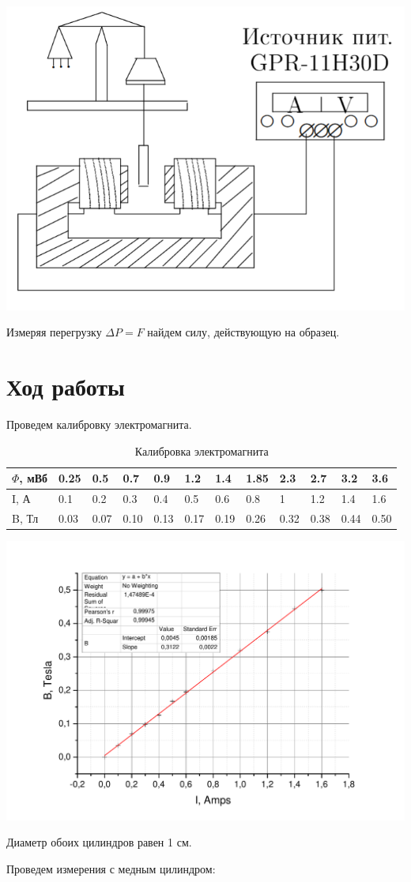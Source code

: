 \documentclass[a4paper,12pt]{article}
\begin{document}
	\includegraphics[width = 0.5\linewidth]{pic1}
	
	Измеряя перегрузку $\Delta P = F$ найдем силу, действующую на образец.
	\section{Ход работы}
	Проведем калибровку электромагнита.
		
		\begin{table}[h]
			\centering
			\caption{Калибровка электромагнита}
			\label{my-label}
			\begin{tabular}{|l|l|l|l|l|l|l|l|l|l|l|l|}
				\hline
				$\Phi$, мВб & 0.25 & 0.5  & 0.7  & 0.9  & 1.2  & 1.4  & 1.85 & 2.3  & 2.7  & 3.2  & 3.6  \\ \hline
				I, А     & 0.1  & 0.2  & 0.3  & 0.4  & 0.5  & 0.6  & 0.8  & 1    & 1.2  & 1.4  & 1.6  \\ \hline
				B, Тл     & 0.03 & 0.07 & 0.10 & 0.13 & 0.17 & 0.19 & 0.26 & 0.32 & 0.38 & 0.44 & 0.50 \\ \hline
			\end{tabular}
		\end{table}
		
		\includegraphics[width = 0.7\linewidth]{graph1}
	
	Диаметр обоих цилиндров равен 1 см.	
		
	Проведем измерения с медным цилиндром:
	
\end{document}
